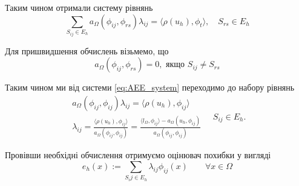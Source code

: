 Таким чином отримали систему рівнянь
%
\begin{equation}\label{eq:AEE_system}
	\sum \limits_{S_{ij} \in E_h} a_\Omega(\phi_{ij}, \phi_{rs}) \lambda_{ij} = \langle \rho(u_h), \phi_t \rangle, \quad S_{rs} \in E_h
\end{equation}

Для пришвидшення обчислень візьмемо, що
%
\begin{equation}
	a_\Omega(\phi_{ij}, \phi_{rs}) = 0, \text{ якщо } S_{ij} \ne S_{rs}
\end{equation}

Таким чином ми від системи \eqref{eq:AEE_system} переходимо до набору рівнянь
%
\begin{equation}
	\begin{split}
		a_\Omega(\phi_{ij}, \phi_{ij}) \lambda_{ij} = \langle \rho(u_h), \phi_{ij} \rangle\\
		\lambda_{ij} = \frac{\langle \rho(u_h), \phi_{ij} \rangle}{a_\Omega(\phi_{ij}, \phi_{ij})}
			= \frac{\langle l_\Omega, \phi_{ij}\rangle - a_\Omega(u_h, \phi_{ij})}{a_\Omega(\phi_{ij}, \phi_{ij})}
	\end{split}
	\quad S_{ij} \in E_h.
\end{equation}

Провівши необхідні обчислення отримуємо оцінювач похибки у вигляді
\begin{equation}\label{eq:AEE_final}
	e_h(x) := \sum \limits_{S_ij \in E_h} \lambda_{ij} \phi_{ij}(x) \qquad \forall x \in \Omega
\end{equation}
